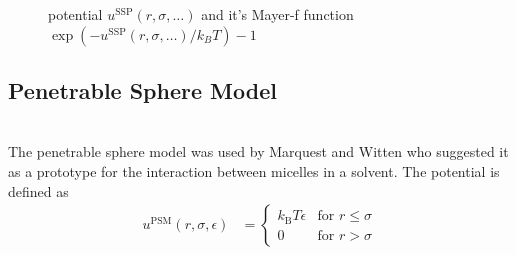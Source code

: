 
\begin{figure}[htb]
\centering
  \quad
  \caption{potential $u^\text{SSP}(r,\sigma,\ldots)$ and it's Mayer-f function $\exp(-u^\text{SSP}(r,\sigma,\ldots)/k_BT)-1$}
\end{figure}

\newpage
\subsection{Penetrable Sphere Model}
~\\

The penetrable sphere model was used by Marquest and
Witten \cite{Marquest1989} who suggested it as a prototype for the interaction between micelles in a solvent.
The potential is defined as \cite{Marquest1989,Viererblova2010}
\begin{align}
u^\text{PSM}(r,\sigma,\epsilon) &=
\begin{cases}
k_\text{B} T \epsilon   & \mbox{for } r \leq \sigma \\
0                       & \mbox{for } r >    \sigma
\end{cases}
\end{align}

